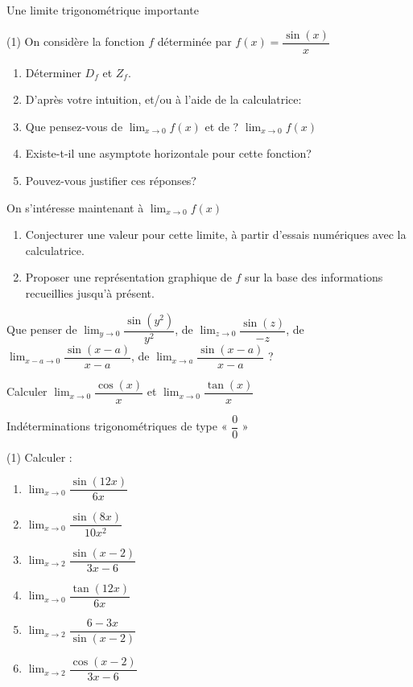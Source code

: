 \documentclass[a4paper,12pt]{article}
\begin{document}
\begin{activite}{Une limite trigonométrique importante}
\tcblower
\begin{tasks}(1)
\task On considère la fonction $f$ déterminée par $f(x) = \dfrac{\sin(x)}{x}$
\begin{enumerate}
\item Déterminer $D_f$ et $Z_f$.
\item D'après votre intuition, et/ou à l'aide de la calculatrice:
\item Que pensez-vous de $\displaystyle\lim_{x \to 0} f(x)$ et de ? $\displaystyle\lim_{x \to 0} f(x)$
\item Existe-t-il une asymptote horizontale pour cette fonction?
\item Pouvez-vous justifier ces réponses?
\end{enumerate}

\task On s'intéresse maintenant à $\displaystyle\lim_{x \to 0} f(x)$
\begin{enumerate}
\item Conjecturer une valeur pour cette limite, à partir d'essais numériques avec la calculatrice.
\item Proposer une représentation graphique de $f$ sur la base des informations recueillies jusqu'à présent.
\end{enumerate}

\task Que penser de $\displaystyle\lim_{y \to 0} \dfrac{\sin(y^2)}{y^2}$, de $\displaystyle\lim_{z \to 0} \dfrac{\sin(z)}{-z}$, de $\displaystyle\lim_{x-a \to 0} \dfrac{\sin(x-a)}{x-a}$, de $\displaystyle\lim_{x \to a} \dfrac{\sin(x-a)}{x-a}$ ?

\task Calculer $\displaystyle\lim_{x \to 0} \dfrac{\cos(x)}{x}$ et $\displaystyle\lim_{x \to 0} \dfrac{\tan(x)}{x}$
\end{tasks}
\end{activite}
\begin{activite}{Indéterminations trigonométriques de type « $\dfrac{0}{0}$ »}
\tcblower
\begin{tasks}(1)
\task Calculer :
\begin{multicols}{3}
\begin{enumerate}
\item $\displaystyle\lim_{x \to 0} \dfrac{\sin(12x)}{6x}$
\item $\displaystyle\lim_{x \to 0} \dfrac{\sin(8x)}{10x^2}$
\item $\displaystyle\lim_{x \to 2} \dfrac{\sin(x-2)}{3x-6}$
\item $\displaystyle\lim_{x \to 0} \dfrac{\tan(12x)}{6x}$
\item $\displaystyle\lim_{x \to 2} \dfrac{6-3x}{\sin(x-2)}$
\item $\displaystyle\lim_{x \to 2} \dfrac{\cos(x-2)}{3x-6}$
\end{enumerate}
\end{multicols}
\end{tasks}
\end{activite}
\end{document}
